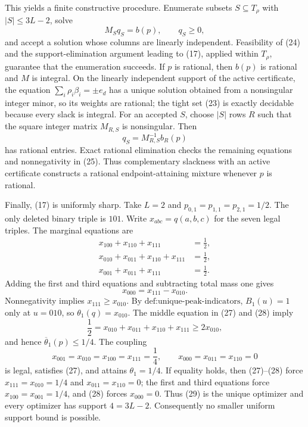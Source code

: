 This yields a finite constructive procedure.  Enumerate subsets \(S\subseteq T_\rho\) with \(|S|\leq3L-2\), solve
\[
 M_Sq_S=b(p),\qquad q_S\geq0,                                               \tag{25}
\]
and accept a solution whose columns are linearly independent.  Feasibility of (24) and the support-elimination argument leading to (17), applied within \(T_\rho\), guarantee that the enumeration succeeds.  If \(p\) is rational, then \(b(p)\) is rational and \(M\) is integral.  On the linearly independent support of the active certificate, the equation \(\sum_i\rho_i\beta_i=\pm e_d\) has a unique solution obtained from a nonsingular integer minor, so its weights are rational; the tight set (23) is exactly decidable because every slack is integral.  For an accepted \(S\), choose \(|S|\) rows \(R\) such that the square integer matrix \(M_{R,S}\) is nonsingular.  Then
\[
 q_S=M_{R,S}^{-1}b_R(p)                                                     \tag{26}
\]
has rational entries.  Exact rational elimination checks the remaining equations and nonnegativity in (25).  Thus complementary slackness with an active certificate constructs a rational endpoint-attaining mixture whenever \(p\) is rational.

Finally, (17) is uniformly sharp.  Take \(L=2\) and \(p_{0,1}=p_{1,1}=p_{2,1}=1/2\).  The only deleted binary triple is \(101\).  Write \(x_{abc}=q(a,b,c)\) for the seven legal triples.  The marginal equations are
\[
\begin{aligned}
 x_{100}+x_{110}+x_{111}&=\frac12,\\
 x_{010}+x_{011}+x_{110}+x_{111}&=\frac12,\\
 x_{001}+x_{011}+x_{111}&=\frac12.
\end{aligned}                                                               \tag{27}
\]
Adding the first and third equations and subtracting total mass one gives
\[
 x_{000}=x_{111}-x_{010}.                                                    \tag{28}
\]
Nonnegativity implies \(x_{111}\geq x_{010}\).  By \(\text{def:unique-peak-indicators}\), \(B_1(u)=1\) only at \(u=010\), so \(\theta_1(q)=x_{010}\).  The middle equation in (27) and (28) imply
\[
 \frac12=x_{010}+x_{011}+x_{110}+x_{111}\geq2x_{010},
\]
and hence \(\overline\theta_1(p)\leq1/4\).  The coupling
\[
 x_{001}=x_{010}=x_{100}=x_{111}=\frac14,
 \qquad x_{000}=x_{011}=x_{110}=0                                          \tag{29}
\]
is legal, satisfies (27), and attains \(\theta_1=1/4\).  If equality holds, then (27)--(28) force \(x_{111}=x_{010}=1/4\) and \(x_{011}=x_{110}=0\); the first and third equations force \(x_{100}=x_{001}=1/4\), and (28) forces \(x_{000}=0\).  Thus (29) is the unique optimizer and every optimizer has support \(4=3L-2\).  Consequently no smaller uniform support bound is possible.

